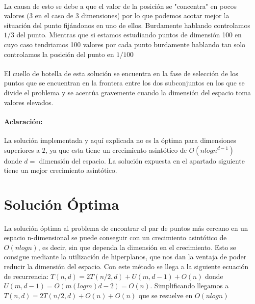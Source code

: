 \documentclass{article}
\begin{document}
		\paragraph{}
		La causa de esto se debe a que el valor de la posición se "concentra" en pocos valores (3 en el caso de 3 dimensiones) por lo que podemos acotar mejor la situación del punto fijándonos en uno de ellos. Burdamente hablando controlamos $1/3$ del punto. Mientras que si estamos estudiando puntos de dimensión 100 en cuyo caso tendriamos 100 valores por cada punto burdamente hablando tan solo controlamos la posición del punto en $1/100$
		
		\paragraph{}
		El cuello de botella de esta solución se encuentra en la fase de selección de los puntos que se encuentran en la frontera entre los dos subconjuntos en los que se divide el problema y se acentúa gravemente cuando la dimensión del espacio toma valores elevados.
		
		\paragraph{Aclaración:}
		La solución implementada y aquí explicada no es la óptima para dimensiones superiores a 2, ya que esta tiene un crecimiento asintótico de $O(nlogn^{d-1})$ donde $d = $ dimensión del espacio. La solución expuesta en el apartado siguiente tiene un mejor crecimiento asintótico.
		
\section{Solución Óptima}

	\paragraph{}
	La solución óptima al problema de encontrar el par de puntos más cercano en un espacio n-dimensional se puede conseguir con un crecimiento asintótico de $O(nlogn)$, es decir, sin que dependa la dimensión en el crecimiento. Esto se consigue mediante la utilización de hiperplanos, que nos dan la ventaja de poder reducir la dimensión del espacio. Con este método se llega a la siguiente ecuación de recurrencia:
	$T(n, d) = 2T(n/2, d) + U(m, d - 1) + O(n)$ donde $U(m, d-1)=O(m (logm) d - 2) = O(n)$. Simplificando llegamos a $T(n,d)=2T(n/2,d)+O(n)+O(n)$ que se resuelve en $O(nlogn)$ 
\end{document}
